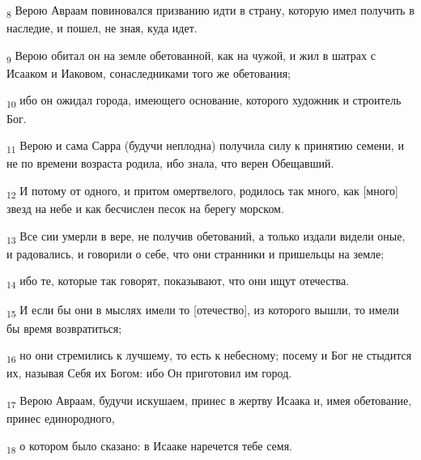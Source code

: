 \begin{tcolorbox}
\textsubscript{8} Верою Авраам повиновался призванию идти в страну, которую имел получить в наследие, и пошел, не зная, куда идет.
\end{tcolorbox}
\begin{tcolorbox}
\textsubscript{9} Верою обитал он на земле обетованной, как на чужой, и жил в шатрах с Исааком и Иаковом, сонаследниками того же обетования;
\end{tcolorbox}
\begin{tcolorbox}
\textsubscript{10} ибо он ожидал города, имеющего основание, которого художник и строитель Бог.
\end{tcolorbox}
\begin{tcolorbox}
\textsubscript{11} Верою и сама Сарра (будучи неплодна) получила силу к принятию семени, и не по времени возраста родила, ибо знала, что верен Обещавший.
\end{tcolorbox}
\begin{tcolorbox}
\textsubscript{12} И потому от одного, и притом омертвелого, родилось так много, как [много] звезд на небе и как бесчислен песок на берегу морском.
\end{tcolorbox}
\begin{tcolorbox}
\textsubscript{13} Все сии умерли в вере, не получив обетований, а только издали видели оные, и радовались, и говорили о себе, что они странники и пришельцы на земле;
\end{tcolorbox}
\begin{tcolorbox}
\textsubscript{14} ибо те, которые так говорят, показывают, что они ищут отечества.
\end{tcolorbox}
\begin{tcolorbox}
\textsubscript{15} И если бы они в мыслях имели то [отечество], из которого вышли, то имели бы время возвратиться;
\end{tcolorbox}
\begin{tcolorbox}
\textsubscript{16} но они стремились к лучшему, то есть к небесному; посему и Бог не стыдится их, называя Себя их Богом: ибо Он приготовил им город.
\end{tcolorbox}
\begin{tcolorbox}
\textsubscript{17} Верою Авраам, будучи искушаем, принес в жертву Исаака и, имея обетование, принес единородного,
\end{tcolorbox}
\begin{tcolorbox}
\textsubscript{18} о котором было сказано: в Исааке наречется тебе семя.
\end{tcolorbox}
